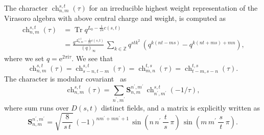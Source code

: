 \documentclass[12pt,reqno]{amsart}
\DeclareMathOperator{\Tr}{Tr}
\DeclareMathOperator{\ch}{ch}
\begin{document}
The character $\ch_{n,m}^{s,t}(\tau)$ for an irreducible highest weight 
representation of the Virasoro algebra with above central charge and
weight,
is computed as~\cite{Rocha84a,BFeigDBFuk83a}
\begin{align}
  \ch_{n,m}^{s,t}(\tau)
  & =
  \Tr  q^{L_0 - \frac{1}{24} c(s,t)}
  \nonumber \\
  & =
  \frac{q^{\Delta^{s,t}_{n,m} - \frac{1}{24} c(s,t)}}{(q)_\infty} \,
  \sum_{k \in \mathbb{Z}}
  q^{s t k^2} \,
  \left(
    q^{k ( n t - m s)} - q^{k ( n t +m s)+ m n}
  \right) ,
\end{align}
where we set $q=\mathrm{e}^{2 \pi \mathrm{i} \tau}$.
We see that
\begin{equation*}
  \ch_{n,m}^{s,t}(\tau)
  =
  \ch_{s-n,t-m}^{s,t}(\tau)
  =
  \ch_{m,n}^{t,s}(\tau)
  =
  \ch_{t-m,s-n}^{t,s}(\tau) .
\end{equation*}
The  character is modular
covariant~\cite{ItzyZube86,CappItzyZube87b} as
\begin{equation}
  \ch_{n,m}^{s,t}(\tau)
  =
  \sum_{n^\prime , m^\prime}
  \mathbf{S}_{n,m}^{n^\prime , m^\prime} \,
  \ch_{n^\prime , m^\prime}^{s,t} (-1 / \tau) ,
\end{equation}
where sum runs over $D(s,t)$ distinct fields, and a matrix is
explicitly written as
\begin{equation}
  \mathbf{S}_{n,m}^{n^\prime , m^\prime}
  =
  \sqrt{\frac{8}{\   s \, t   \  }} \,
  (-1)^{n  m^\prime + m n^\prime +1} \,
  \sin
  \left(
     n \, n^\prime \, \frac{\ t  \  }{s}  \,  \pi 
  \right) \,
  \sin
  \left(
      m \, m^\prime \, \frac{ s}{ \  t  \  } \, \pi
  \right) .
\end{equation}
\end{document}
